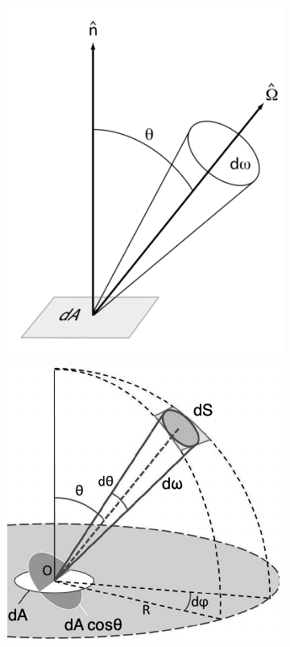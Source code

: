 \begin{figure}[h]
   \centering
\begin{subfigure}[h]{0.45\textwidth}
	\centering
   	 \includegraphics[scale=0.4]{Figures/specific_intensity_def_3D.png} 
\end{subfigure}
\begin{subfigure}[h]{0.5\textwidth}
	\centering
	\includegraphics[scale=0.5]{Figures/specific_intensity_example.png} 

\end{subfigure}
\end{figure}
